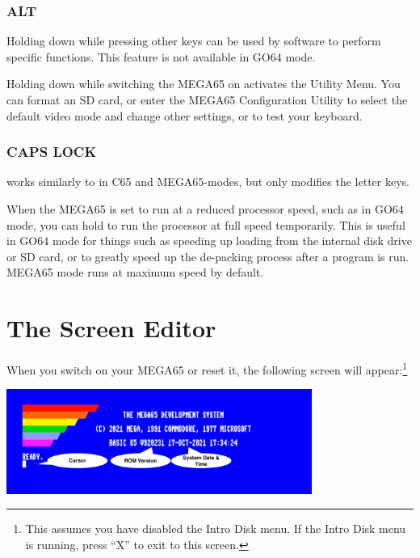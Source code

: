 \subsubsection{ALT}
Holding  down while pressing other keys can be used by software to perform specific functions. This feature is not available in GO64 mode.

Holding  down while switching the MEGA65 on activates the Utility Menu. You can format an SD card, or enter the MEGA65 Configuration Utility to select the default video mode and change other settings, or to test your keyboard.

\subsubsection{CAPS LOCK}
 works similarly to  in C65 and MEGA65-modes, but only modifies the letter keys.

When the MEGA65 is set to run at a reduced processor speed, such as in GO64 mode, you can hold  to run the processor at full speed temporarily. This is useful in GO64 mode for things such as
speeding up loading from the internal disk drive or SD card, or to greatly speed up the de-packing process after a program is run. MEGA65 mode runs at maximum speed by default.



\section{The Screen Editor}
\label{sec:screen-editor}

When you switch on your MEGA65 or reset it, the following screen will appear:\footnote{This assumes you have disabled the Intro Disk menu. If the Intro Disk menu is running, press ``X'' to exit to this screen.}

\begin{center}
\includegraphics[width={10cm}]{images/introduction-screen/layout.png}
\end{center}

